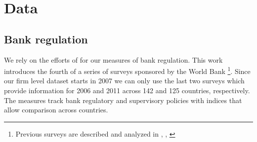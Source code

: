 \documentclass[12pt]{article}
\begin{document}
	\section{Data} \label{sec:data}	
	\subsection{Bank regulation} \label{subsec:MPI}
	
	We rely on the efforts of \cite*{barth2013bank} for our measures of bank regulation. This work introduces the fourth of a series of surveys sponsored by the World Bank \footnote{Previous surveys are described and analyzed in \cite{barth2001regulation}, \cite{barth2004bank}, \cite{barth2008bank}}. Since our firm level dataset starts in 2007 we can only use the last two surveys which provide information for 2006 and 2011 across 142 and 125 countries, respectively. The measures track bank regulatory and supervisory policies with indices that allow comparison across countries.
\end{document}
